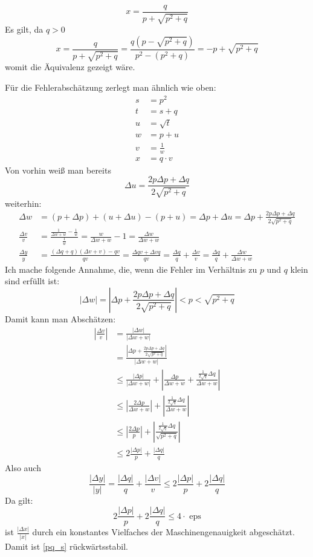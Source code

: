 \documentclass{mywork}
\begin{document}
\begin{aufgabe}
	\begin{equation}
		\label{pq_s}
		x=\frac q{p+\sqrt{p^2+q}}
	\end{equation}
	Es gilt, da $q>0$
	\[
		x=\frac q{p+\sqrt{p^2+q}}=\frac{q(p-\sqrt{p^2+q})}{p^2-(p^2+q)}=-p+\sqrt{p^2+q}
	\]
	womit die Äquivalenz gezeigt wäre.

	Für die Fehlerabschätzung zerlegt man ähnlich wie oben:
	\begin{align*}
		s&=p^2\\
		t&=s +q\\
		u&=\sqrt{t}\\
		w&=p+u\\
		v&=\frac 1w\\
		x&=q\cdot v
	\end{align*}
	Von vorhin weiß man bereits
	\[
		\Delta u=\frac{2p\Delta p+\Delta q}{2\sqrt{p^2+q}}
	\]
	weiterhin:
	\begin{align*}
		\Delta w&=(p + \Delta p)+(u + \Delta u)-(p+u)=\Delta p + \Delta u =\Delta p+\frac{2p\Delta p+\Delta q}{2\sqrt{p^2+q}}\\
\frac{\Delta v}v&=\frac{\frac{1}{\Delta w + w}-\frac 1w}{\frac 1w}=\frac w{\Delta w + w}-1=\frac{\Delta w}{\Delta w +w}\\
  \frac {\Delta y}y&=\frac{(\Delta q + q)(\Delta v +v)-qv}{qv}=\frac{\Delta qv+\Delta vq}{qv}=\frac {\Delta q}q+\frac {\Delta v}v = \frac {\Delta q}q + \frac{\Delta w}{\Delta w + w}
	\end{align*}
	Ich mache folgende Annahme, die, wenn die Fehler im Verhältnis zu $p$ und $q$ klein sind erfüllt ist:
	\[
		|\Delta w|=\left|\Delta p+\frac{2p\Delta p+\Delta q}{2\sqrt{p^2+q}}\right|<p<\sqrt{p^2+q}
	\]
	Damit kann man Abschätzen:
	\begin{align*}
		\left|\frac{\Delta v}v\right| &= \frac{|\Delta w|}{|\Delta w + w|}\\
								&=\frac{\left|\Delta p+\frac{2p\Delta p+\Delta q}{2\sqrt{p^2+q}}\right|}
		{|\Delta w + w|}\\%
		&\le \frac{|\Delta p|}{|\Delta w +w|}+\left|\frac{\Delta p}{\Delta w +w}+\frac {\frac 1{2\sqrt q}\Delta q}{\Delta w + w}\right|\\
		&\le \left|\frac{2\Delta p}{\Delta w + w}\right|+\left|\frac{\frac 1{2\sqrt{q}}\Delta q}{\Delta w+w}\right|\\
		&\le \left|\frac{2\Delta p}{p}\right|+\left|\frac{\frac 1{2\sqrt{q}}\Delta q}{\sqrt{p^2+q}}\right|\\
		&\le 2\frac{|\Delta p|}{p}+\frac{|\Delta q|}{q}
	\end{align*}
	Also auch
	\[
		\frac{|\Delta y|}{|y|}=\frac {|\Delta q|}q+\frac{|\Delta v|}v\le 2\frac{|\Delta p|}{p}+2\frac{|\Delta q|}{q}
	\]
	Da gilt:
	\[
		2\frac{|\Delta p|}p+2\frac{|\Delta q|}q\le 4\cdot \text{ eps}
	\]
	ist $\frac{|\Delta x|}{|x|}$ durch ein konstantes Vielfaches der Maschinengenauigkeit abgeschätzt.
	Damit ist \eqref{pq_s} rückwärtsstabil.
\end{aufgabe}
\end{document}
